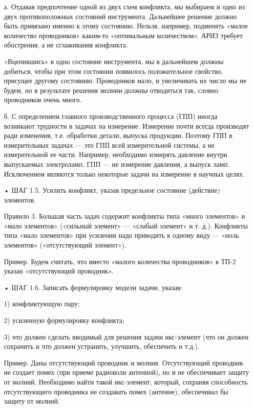 а. Отдавая  предпочтение одной из  двух схем конфликта, мы  выбираем и
одно из двух противоположных состояний инструмента. Дальнейшее решение
должно  быть привязано  именно  к этому  состоянию. Нельзя,  например,
подменять   «малое  количество   проводников»  каким-то   «оптимальным
количеством». АРИЗ требует обострения, а не сглаживания конфликта.

«Вцепившись»  в одно  состояние  инструмента, мы  в дальнейшем  должны
добиться, чтобы  при этом состоянии появилось  положительное свойство,
присущее другому  состоянию. Проводников мало, и  увеличивать их число
мы не  будем, но  в результате решения  молнии должны  отводиться так,
словно проводников очень много.

б.  С определением  главного производственного  процесса (ГПП)  иногда
возникают  трудности в  задачах на  измерение. Измерение  почти всегда
производят ради  изменения, т.е. обработки детали,  выпуска продукции.
Поэтому  ГПП в  измерительных  задачах —  это  ГПП всей  измерительной
системы, а  не измерительной  ее части. Например,  необходимо измерять
давление внутри выпускаемых электроламп.  ГПП — не измерение давления,
а  выпуск  ламп.  Исключением  являются  только  некоторые  задачи  на
измерение в научных целях.


• ШАГ  1.5. Усилить  конфликт, указав предельное  состояние (действие)
элементов.

Правило  3.  Большая  часть   задач  содержит  конфликты  типа  «много
элементов» и «мало элементов» («сильный  элемент» — «слабый элемент» и
т. д.). Конфликты типа «мало  элементов» при усилении надо приводить к
одному виду — «ноль элементов» («отсутствующий элемент»).

Пример. Будем  считать, что  вместо «малого количества  проводников» в
ТП-2 указан «отсутствующий проводник».


• ШАГ 1.6. Записать формулировку модели задачи, указав:

1) конфликтующую пару;

2) усиленную формулировку конфликта;

3) что должен сделать вводимый  для решения задачи икс-элемент (что он
должен сохранить и что должен устранить, улучшить, обеспечить и т.д.).

Пример. Даны отсутствующий проводник и молния. Отсутствующий проводник
не создает помех (при приеме радиоволн антенной), но и не обеспечивает
защиту  от  молний.  Необходимо   найти  такой  икс-элемент,  который,
сохраняя  способность  отсутствующего  проводника не  создавать  помех
(антенне), обеспечивал бы защиту от молний.



